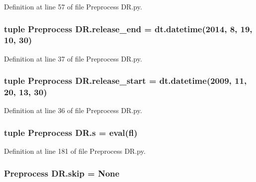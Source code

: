 Definition at line 57 of file Preprocess D\+R.\+py.

\hypertarget{namespace_preprocess_01_d_r_a7026d20c2cef287201c48fdf79c0e8f7}{}
\subsubsection[{release\+\_\+end}]{\setlength{\rightskip}{0pt plus 5cm}tuple Preprocess D\+R.\+release\+\_\+end = dt.\+datetime(2014, 8, 19, 10, 30)}\label{namespace_preprocess_01_d_r_a7026d20c2cef287201c48fdf79c0e8f7}


Definition at line 37 of file Preprocess D\+R.\+py.

\hypertarget{namespace_preprocess_01_d_r_ae8d2848548745ca8cb3fff24f95b8265}{}
\subsubsection[{release\+\_\+start}]{\setlength{\rightskip}{0pt plus 5cm}tuple Preprocess D\+R.\+release\+\_\+start = dt.\+datetime(2009, 11, 20, 13, 30)}\label{namespace_preprocess_01_d_r_ae8d2848548745ca8cb3fff24f95b8265}


Definition at line 36 of file Preprocess D\+R.\+py.

\hypertarget{namespace_preprocess_01_d_r_af55803ec5bfdac4f81d9c47966d0aff1}{}
\subsubsection[{s}]{\setlength{\rightskip}{0pt plus 5cm}tuple Preprocess D\+R.\+s = eval(fl)}\label{namespace_preprocess_01_d_r_af55803ec5bfdac4f81d9c47966d0aff1}


Definition at line 181 of file Preprocess D\+R.\+py.

\hypertarget{namespace_preprocess_01_d_r_a28a0d49fbacac27b8de4fd609043b742}{}
\subsubsection[{skip}]{\setlength{\rightskip}{0pt plus 5cm}Preprocess D\+R.\+skip = None}\label{namespace_preprocess_01_d_r_a28a0d49fbacac27b8de4fd609043b742}


